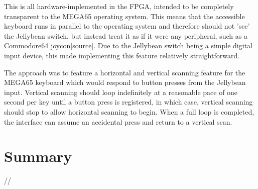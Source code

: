This is all hardware-implemented in the FPGA, intended to be completely transparent to the MEGA65 operating system.
This means that the accessible keyboard runs in parallel to the operating system and therefore should not 'see' the Jellybean switch, but instead treat it as if it were any peripheral, such as a Commodore64 joycon[source].
Due to the Jellybean switch being a simple digital input device, this made implementing this feature relatively straightforward.

The approach was to feature a horizontal and vertical scanning feature for the MEGA65 keyboard which would respond to button presses from the Jellybean input.
Vertical scanning should loop indefinitely at a reasonable pace of one second per key until a button press is registered, in which case, vertical scanning should stop to allow horizontal scanning to begin.
When a full loop is completed, the interface can assume an accidental press and return to a vertical scan. %






\section{Summary}  %
//